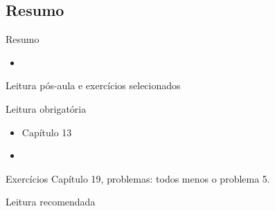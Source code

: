 \documentclass{beamer}
\begin{document}
\subsection{Resumo}

\begin{frame}{Resumo}
  \begin{itemize}
  \item
  \end{itemize}
\end{frame}

\begin{frame}{Leitura pós-aula e exercícios selecionados}
  \begin{block}{Leitura obrigatória}
    \begin{itemize}
    \item Capítulo 13
    \item 
    \end{itemize}
  \end{block}
  \begin{block}{Exercícios}
    Capítulo 19, problemas: todos menos o problema 5.
  \end{block}
  \begin{block}{Leitura recomendada}
  \end{block}
\end{frame}
\end{document}
